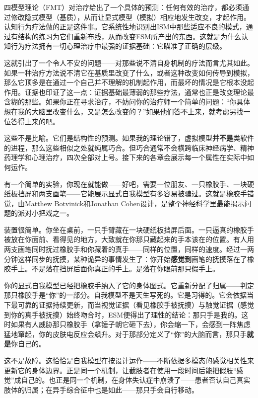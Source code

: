 \documentclass[11pt, twoside, openright]{book}
\begin{document}
四模型理论（FMT）对治疗给出了一个具体的预测：任何有效的治疗，都必须通过修改隐式模型（基质），从而让显式模型（模拟）相应地发生改变，才起作用。认知行为疗法做的正是这件事。它系统性地识别出ISM中那些适应不良的模式，通过有结构的练习为它们重新布线，从而改变ESM所产出的东西。这就是为什么认知行为疗法拥有一切心理治疗中最强的证据基础：它瞄准了正确的层级。

这就引出了一个令人不安的问题------对那些说不清自身机制的疗法而言尤其如此。如果一种治疗方法说不清它在基质里改变了什么，或者这种改变如何传导到模拟，那么它顶多是在通过一个自己并不理解的机制起作用，而最坏的情况是它根本没起作用。证据也印证了这一点：证据基础最薄弱的那些疗法，通常也正是改变理论最含糊的那些。如果你正在寻求治疗，不妨问你的治疗师一个简单的问题：“你具体想在我的大脑里改变什么，又是怎么改变的？”如果他们答不上来，就考虑另找一位答得上来的吧。

这些不是比喻。它们是结构性的预测。如果我的理论错了，虚拟模型\textbf{并不是}类软件的进程，那么这些相似之处就纯属巧合。但巧合通常不会横跨临床神经病学、精神药理学和心理治疗，四次全部对上号。接下来的各章会展示每一个属性在实际中如何运作。

有一个简单的实验，你现在就能做------好吧，需要一位朋友、一只橡胶手、一块硬纸板挡屏和两支画笔------它能展示显式自我模型有多容易被骗过。这就是橡胶手错觉，由Matthew Botvinick和Jonathan Cohen设计，是整个神经科学里最能揭示问题的派对小把戏之一。

装置很简单。你坐在桌前，一只手臂藏在一块硬纸板挡屏后面。一只逼真的橡胶手被放在你面前、看得见的地方，大致就在你那只藏起来的手本该在的位置。有人用两支画笔同时抚过橡胶手和你藏着的真手------同样的位置，同样的速度。经过一两分钟这样同步的抚摸，某种诡异的事情发生了：你开始\textbf{感觉到}画笔的抚摸落在了橡胶手上。不是落在挡屏后面你真正的手上。是落在你眼前那只假手上。

你的显式自我模型已经把橡胶手纳入了它的身体图式。它重新分配了归属------判定那只橡胶手是“你”的一部分。自我模型不是天生写死的。它是习得的。它会依据当下最可靠的证据持续更新，而当视觉证据（看见橡胶手被抚摸）与触觉证据（感觉到你的真手被抚摸）始终吻合时，ESM便得出了理性的结论：那只手是我的。这时如果有人威胁那只橡胶手（拿锤子朝它砸下去），你会缩一下，会感到一阵焦虑猛地窜起，你的皮肤电反应会飙升。对于那部分定义了“你”的大脑而言，那只手\textbf{就是}你自己的。

这不是故障。这恰恰是自我模型在按设计运作------不断依据多模态的感觉相关性来更新它的身体边界。正是同一个机制，让截肢者在使用一段时间后能把假肢“感觉”成自己的。也正是同一个机制，在身体失认症中崩溃了------患者否认自己真实肢体的归属；在异手综合征中也是如此------那只手会自行移动。
\end{document}
